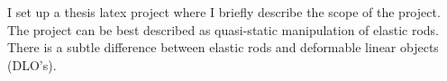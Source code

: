 I set up a thesis latex project where I briefly describe the
      scope of the project. The project can be best described as quasi-static
      manipulation of elastic rods. There is a subtle difference between elastic
      rods and deformable linear objects (DLO's). 
